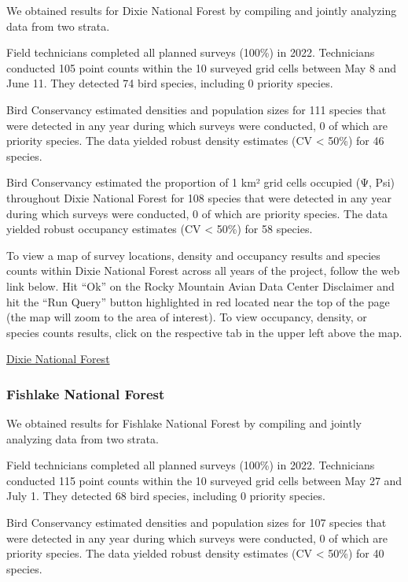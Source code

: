 \documentclass[
  letterpaper,
  DIV=11,
  numbers=noendperiod,
  oneside]{scrreprt}
\begin{document}
We obtained results for Dixie National Forest by compiling and jointly
analyzing data from two strata.

Field technicians completed all planned surveys (100\%) in 2022.
Technicians conducted 105 point counts within the 10 surveyed grid cells
between May 8 and June 11. They detected 74 bird species, including 0
priority species.

Bird Conservancy estimated densities and population sizes for 111
species that were detected in any year during which surveys were
conducted, 0 of which are priority species. The data yielded robust
density estimates (CV \textless{} 50\%) for 46 species.

Bird Conservancy estimated the proportion of 1 km² grid cells occupied
(Ψ, Psi) throughout Dixie National Forest for 108 species that were
detected in any year during which surveys were conducted, 0 of which are
priority species. The data yielded robust occupancy estimates (CV
\textless{} 50\%) for 58 species.

To view a map of survey locations, density and occupancy results and
species counts within Dixie National Forest across all years of the
project, follow the web link below. Hit ``Ok'' on the Rocky Mountain
Avian Data Center Disclaimer and hit the ``Run Query'' button
highlighted in red located near the top of the page (the map will zoom
to the area of interest). To view occupancy, density, or species counts
results, click on the respective tab in the upper left above the map.

\href{http://www.rmbo.org/new_site/adc/QueryWindow.aspx\#N4IgzgrgDgpgTmALnAhoiBbEAuABCAEQEsAPImXAOTSIHsA7FAG1wDFa4YkQBfIA}{Dixie
National Forest}

\hypertarget{fishlake-national-forest}{%
\subsubsection{Fishlake National
Forest}\label{fishlake-national-forest}}

We obtained results for Fishlake National Forest by compiling and
jointly analyzing data from two strata.

Field technicians completed all planned surveys (100\%) in 2022.
Technicians conducted 115 point counts within the 10 surveyed grid cells
between May 27 and July 1. They detected 68 bird species, including 0
priority species.

Bird Conservancy estimated densities and population sizes for 107
species that were detected in any year during which surveys were
conducted, 0 of which are priority species. The data yielded robust
density estimates (CV \textless{} 50\%) for 40 species.
\end{document}
